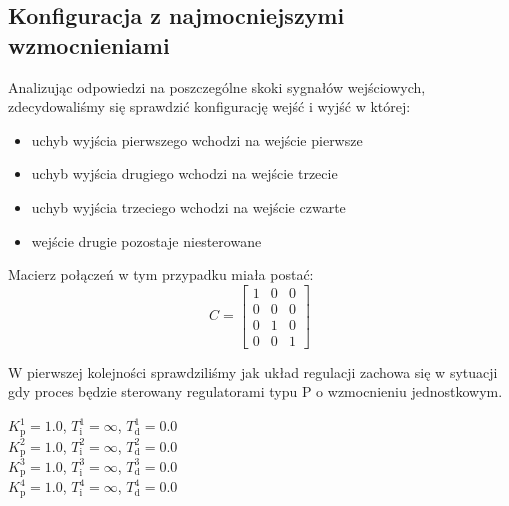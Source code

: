 \subsection{Konfiguracja z najmocniejszymi wzmocnieniami}
\label{pro_pid_konf1}

Analizując odpowiedzi na poszczególne skoki sygnałów wejściowych, zdecydowaliśmy się
sprawdzić konfigurację wejść i wyjść w której:\\

\begin{itemize}
    \item uchyb wyjścia pierwszego wchodzi na wejście pierwsze
    \item uchyb wyjścia drugiego wchodzi na wejście trzecie
    \item uchyb wyjścia trzeciego wchodzi na wejście czwarte
    \item wejście drugie pozostaje niesterowane
\end{itemize}

\noindent Macierz połączeń w tym przypadku miała postać: \\

\[
C =
\begin{bmatrix}
    1 & 0 & 0 \\
    0 & 0 & 0 \\
    0 & 1 & 0 \\
    0 & 0 & 1 
\end{bmatrix}
\]

W pierwszej kolejności sprawdziliśmy jak układ regulacji zachowa się w 
sytuacji gdy proces będzie sterowany regulatorami typu P o wzmocnieniu 
jednostkowym.

\begin{center}
$K^{\num{1}}_{\mathrm{p}} = \num{1.0}$, $T^{\num{1}}_{\mathrm{i}} = \infty$, $T^{\num{1}}_{\mathrm{d}} = \num{0.0}$ \\
$K^{\num{2}}_{\mathrm{p}} = \num{1.0}$, $T^{\num{2}}_{\mathrm{i}} = \infty$, $T^{\num{2}}_{\mathrm{d}} = \num{0.0}$ \\
$K^{\num{3}}_{\mathrm{p}} = \num{1.0}$, $T^{\num{3}}_{\mathrm{i}} = \infty$, $T^{\num{3}}_{\mathrm{d}} = \num{0.0}$ \\
$K^{\num{4}}_{\mathrm{p}} = \num{1.0}$, $T^{\num{4}}_{\mathrm{i}} = \infty$, $T^{\num{4}}_{\mathrm{d}} = \num{0.0}$ \\
\end{center}


